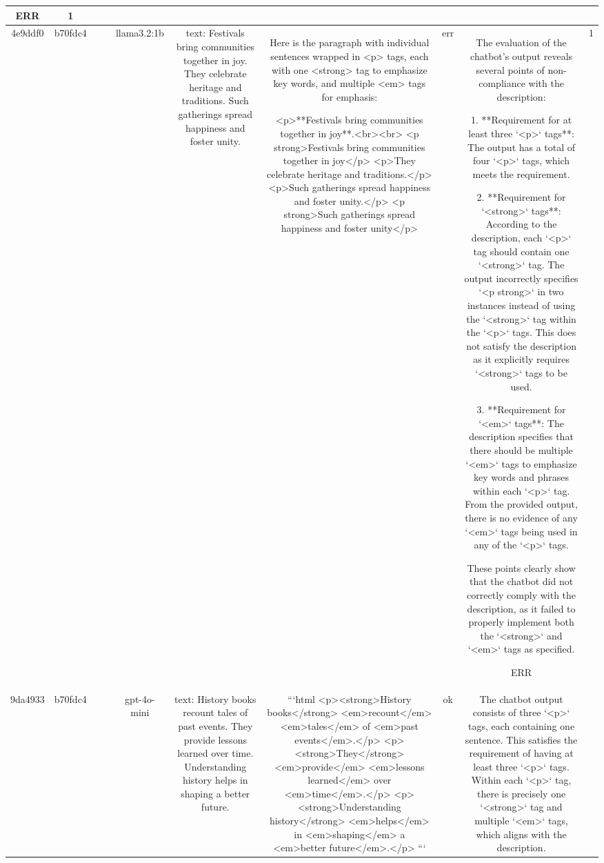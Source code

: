 \begin{table}[h!]
\begin{tabular}{|c|c|c|c|c|c|c|c|c|c|}
ERR & 1\\
\hline
4e9ddf0 & b70fdc4 &  &  & llama3.2:1b & text: Festivals bring communities together in joy. They celebrate heritage and traditions. Such gatherings spread happiness and foster unity. & Here is the paragraph with individual sentences wrapped in <p> tags, each with one <strong> tag to emphasize key words, and multiple <em> tags for emphasis:

<p>**Festivals bring communities together in joy**.<br><br>
<p strong>Festivals bring communities together in joy</p>
<p>They celebrate heritage and traditions.</p>
<p>Such gatherings spread happiness and foster unity.</p>
<p strong>Such gatherings spread happiness and foster unity</p> & err & The evaluation of the chatbot's output reveals several points of non-compliance with the description:

1. **Requirement for at least three `<p>` tags**: The output has a total of four `<p>` tags, which meets the requirement.

2. **Requirement for `<strong>` tags**: According to the description, each `<p>` tag should contain one `<strong>` tag. The output incorrectly specifies `<p strong>` in two instances instead of using the `<strong>` tag within the `<p>` tags. This does not satisfy the description as it explicitly requires `<strong>` tags to be used.

3. **Requirement for `<em>` tags**: The description specifies that there should be multiple `<em>` tags to emphasize key words and phrases within each `<p>` tag. From the provided output, there is no evidence of any `<em>` tags being used in any of the `<p>` tags.

These points clearly show that the chatbot did not correctly comply with the description, as it failed to properly implement both the `<strong>` and `<em>` tags as specified.

ERR & 1\\
\hline
9da4933 & b70fdc4 &  &  & gpt-4o-mini & text: History books recount tales of past events. They provide lessons learned over time. Understanding history helps in shaping a better future. & ```html
<p><strong>History books</strong> <em>recount</em> <em>tales</em> of <em>past events</em>.</p>
<p><strong>They</strong> <em>provide</em> <em>lessons learned</em> over <em>time</em>.</p>
<p><strong>Understanding history</strong> <em>helps</em> in <em>shaping</em> a <em>better future</em>.</p>
``` & ok & The chatbot output consists of three `<p>` tags, each containing one sentence. This satisfies the requirement of having at least three `<p>` tags. Within each `<p>` tag, there is precisely one `<strong>` tag and multiple `<em>` tags, which aligns with the description. 


\end{tabular}
\end{table}
